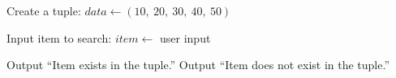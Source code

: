 \begin{algorithm}
\caption{Search an Item in a Tuple}
\begin{algorithmic}[1]

\STATE Create a tuple:
\STATE $data \gets (10,\ 20,\ 30,\ 40,\ 50)$

\STATE Input item to search:
\STATE $item \gets$ user input

    \STATE Output ``Item exists in the tuple.''
\ELSE
    \STATE Output ``Item does not exist in the tuple.''
\ENDIF

\end{algorithmic}
\end{algorithm}